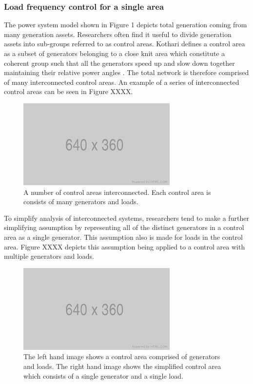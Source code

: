 \documentclass[12pt, a4paper]{article}
\begin{document}
\subsubsection{Load frequency control for a single area}
The power system model shown in Figure 1 depicts total generation coming from many generation assets. Researchers often find it useful to divide generation assets into sub-groups referred to as control areas. Kothari defines a control area as a subset of generators belonging to a close knit area which constitute a coherent group such that all the generators speed up and slow down together maintaining their relative power angles \cite{Kothari2011}. The total network is therefore comprised of many interconnected control areas. An example of a series of interconnected control areas can be seen in Figure XXXX.
\begin{figure}[h]
	\centering
	\includegraphics[scale=0.6]{placeholder}
	\caption{A number of control areas interconnected. Each control area is consists of many generators and loads.}
\end{figure}

To simplify analysis of interconnected systems, researchers tend to make a further simplifying assumption by representing all of the distinct generators in a control area as a single generator. This assumption also is made for loads in the control area. Figure XXXX depicts this assumption being applied to a control area with multiple generators and loads.
\begin{figure}[h]
\centering
\includegraphics[scale=0.6]{placeholder}
\caption{The left hand image shows a control area comprised of generators and loads. The right hand image shows the simplified control area which consists of a single generator and a single load.}
\end{figure}
\end{document}
